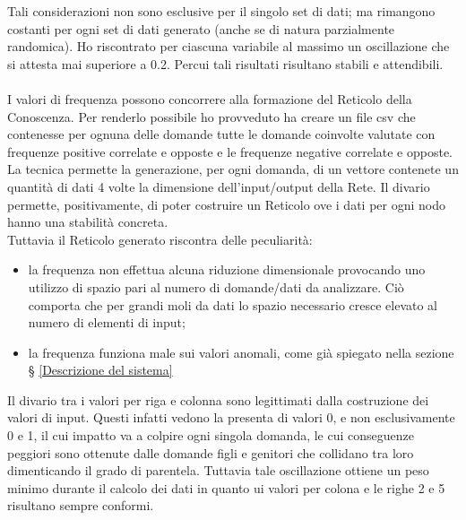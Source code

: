 \noindent
Tali considerazioni non sono esclusive per il singolo set di dati; ma rimangono costanti per ogni set di dati generato (anche se di natura parzialmente randomica). Ho riscontrato per ciascuna variabile al massimo un oscillazione che si attesta mai superiore a 0.2. Percui tali risultati risultano stabili e attendibili.
\\\\
I valori di frequenza possono concorrere alla formazione del Reticolo della Conoscenza. Per renderlo possibile ho provveduto ha creare un file csv che contenesse per ognuna delle domande tutte le domande coinvolte valutate con frequenze positive correlate e opposte e le frequenze negative correlate e opposte. La tecnica permette la generazione, per ogni domanda, di un vettore contenete un quantit\`a di dati 4 volte la dimensione dell'input/output della Rete.
Il divario permette, positivamente, di poter costruire un Reticolo ove i dati per ogni nodo hanno una stabilit\`a concreta.\\
Tuttavia il Reticolo generato riscontra delle peculiarit\`a:
\begin{itemize}
\item la frequenza non effettua alcuna riduzione dimensionale provocando uno utilizzo di spazio pari al numero di domande/dati da analizzare. Ci\`o comporta che per grandi moli da dati lo spazio necessario cresce elevato al numero di elementi di input;
\item la frequenza funziona male sui valori anomali, come gi\`a spiegato nella sezione § \ref{Descrizione del sistema}
\end{itemize}
\noindent
Il divario tra i valori per riga e colonna sono legittimati dalla costruzione dei valori di input. Questi infatti vedono la presenta di valori 0, e non esclusivamente 0 e 1, il cui impatto  va a colpire ogni singola domanda, le cui conseguenze peggiori sono ottenute dalle domande figli e genitori che collidano tra loro dimenticando il grado di parentela. Tuttavia tale oscillazione ottiene un peso minimo durante il calcolo dei dati in quanto ui valori per colona e le righe 2 e 5 risultano sempre conformi.

